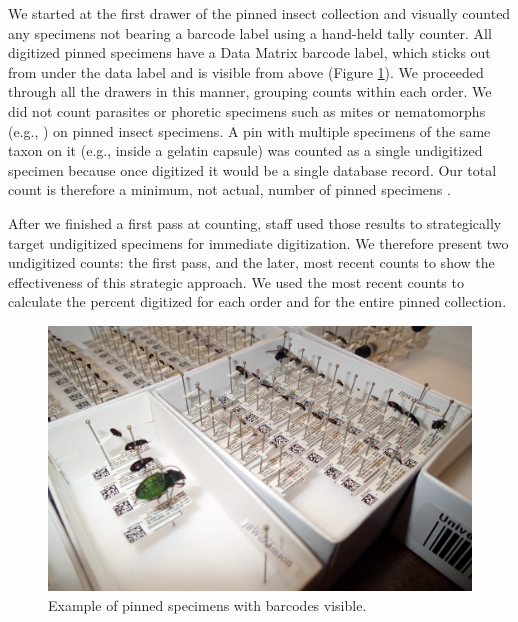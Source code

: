 \begin{multicols}{2}
We started at the first drawer of the pinned insect collection and visually counted any specimens not bearing a  barcode label using a hand-held tally counter. All digitized pinned specimens have a Data Matrix barcode label, which sticks out from under the data label and is visible from above (Figure \ref{barcoded_specimens}). We proceeded through all the drawers in this manner, grouping counts within each order. We did not count parasites or phoretic specimens such as mites or nematomorphs (e.g., ) on pinned insect specimens. A pin with multiple specimens of the same taxon on it (e.g., inside a gelatin capsule) was counted as a single undigitized specimen because once digitized it would be a single database record. Our total count is therefore a minimum, not actual, number of pinned specimens \citep{Sikes2015}. 

After we finished a first pass at counting,  staff used those results to strategically target undigitized specimens for immediate digitization. We therefore present two undigitized counts: the first pass, and the later, most recent counts to show the effectiveness of this strategic approach. We used the most recent counts to calculate the percent digitized for each order and for the entire pinned collection. 

\end{multicols}
\begin{figure}[H]
\begin{center}
\vspace{2mm}
\includegraphics[width=16cm]{img/barcoded_specimens.jpg}
\caption{Example of pinned specimens with  barcodes visible.}
\label{barcoded_specimens}
\end{center}
\end{figure} 
